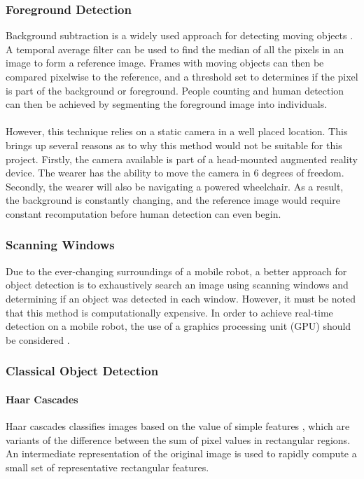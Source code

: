 \subsubsection{Foreground Detection}
Background subtraction is a widely used approach for detecting moving objects \cite{Piccardi2004}. A temporal average filter can be used to find the median of all the pixels in an image to form a reference image. Frames with moving objects can then be compared pixelwise to the reference, and a threshold set to determines if the pixel is part of the background or foreground. People counting and human detection can then be achieved by segmenting the foreground image into individuals.

\paragraph{} However, this technique relies on a static camera in a well placed location. This brings up several reasons as to why this method would not be suitable for this project. Firstly, the camera available is part of a head-mounted augmented reality device. The wearer has the ability to move the camera in 6 degrees of freedom. Secondly, the wearer will also be navigating a powered wheelchair. As a result, the background is constantly changing, and the reference image would require constant recomputation before human detection can even begin.

\subsubsection{Scanning Windows}
Due to the ever-changing surroundings of a mobile robot, a better approach for object detection is to exhaustively search an image using scanning windows and determining if an object was detected in each window. However, it must be noted that this method is computationally expensive. In order to achieve real-time detection on a mobile robot, the use of a graphics processing unit (GPU) should be considered \cite{Hirabayashi}.

\subsubsection{Classical Object Detection}

\paragraph{Haar Cascades}
Haar cascades classifies images based on the value of simple features \cite{Viola2001}, which are variants of the difference between the sum of pixel values in rectangular regions. An intermediate representation of the original image is used to rapidly compute a small set of representative rectangular features.

